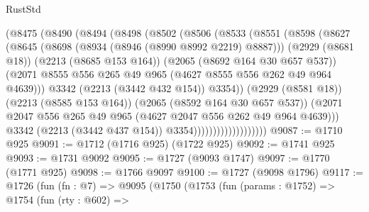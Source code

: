 \begin{lexlean}{RustStd}
\begin{coremodule}
                            (@8475
                              (@8490
                                (@8494
                                  (@8498
                                    (@8502
                                      (@8506
                                        (@8533
                                          (@8551
                                            (@8598
                                              (@8627
                                                (@8645
                                                  (@8698 (@8934 (@8946 (@8990 @8992 @2219) @8887)))
                                                  (@2929 (@8681 @18))
                                                  (@2213 (@8685 @153 @164))
                                                  (@2065 (@8692 @164 @30 @657 @537))
                                                  (@2071
                                                    @8555
                                                    @556
                                                    @265
                                                    @49
                                                    @965
                                                    (@4627 @8555 @556 @262 @49 @964 @4639)))
                                                @3342
                                                (@2213 (@3442 @432 @154))
                                                @3354))
                                            (@2929 (@8581 @18))
                                            (@2213 (@8585 @153 @164))
                                            (@2065 (@8592 @164 @30 @657 @537))
                                            (@2071
                                              @2047
                                              @556
                                              @265
                                              @49
                                              @965
                                              (@4627 @2047 @556 @262 @49 @964 @4639)))
                                          @3342
                                          (@2213 (@3442 @437 @154))
                                          @3354)))))))))))))))))))
@9087 := @1710 @925
@9091 := @1712 (@1716 @925) (@1722 @925)
@9092 := @1741 @925
@9093 := @1731 @9092
@9095 := @1727 (@9093 @1747)
@9097 := @1770 (@1771 @925)
@9098 := @1766 @9097
@9100 := @1727 (@9098 @1796)
@9117 := @1726
    (fun (fn : @7) =>
    @9095
      (@1750
        (@1753
          (fun (params : @1752) =>
          @1754
            (fun (rty : @602) =>

\end{coremodule}
\end{lexlean}
